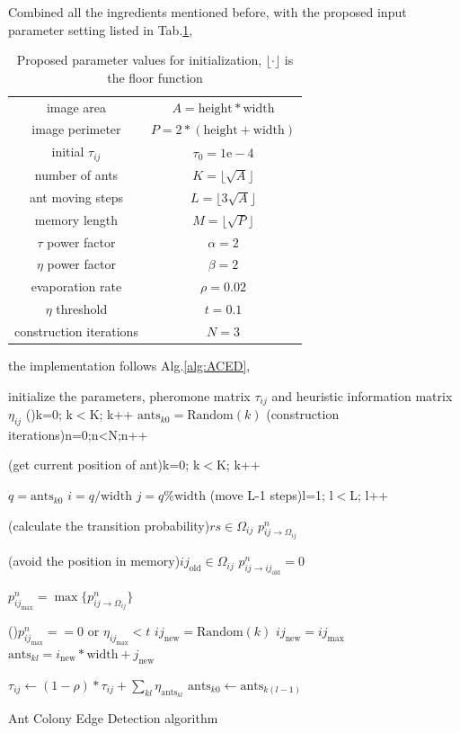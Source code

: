 \documentclass[letterpaper]{article}
\begin{document}
Combined all the ingredients mentioned before, with the proposed input parameter setting listed in Tab.\ref{tab:parameters}, 
\begin{table}[h!]
	\centering
	\begin{tabular}{|c|c|} 
		\hline
		image area & $A=\mathrm{height}*\mathrm{width}$ \\
		image perimeter & $P=2*(\mathrm{height}+\mathrm{width})$ \\
		initial $\tau_{ij}$ & $\tau_0 = 1\mathrm{e}-4$ \\
		number of ants & $K=\lfloor\sqrt{A}\rfloor$ \\
		ant moving steps & $L=\lfloor3\sqrt{A}\rfloor$ \\
		memory length & $M = \lfloor\sqrt{P}\rfloor$ \\
		$\tau$ power factor & $\alpha=2$ \\
		$\eta$ power factor & $\beta=2$ \\
		evaporation rate & $\rho=0.02$ \\
		$\eta$ threshold & $t = 0.1$ \\
		construction iterations & $N = 3$\\ 
		\hline
	\end{tabular}
	\caption{Proposed parameter values for initialization, $\lfloor\cdot\rfloor$ is the floor function}
	\label{tab:parameters}
\end{table}
the implementation follows Alg.\ref{alg:ACED},
\begin{algorithm}
	initialize the parameters, pheromone matrix $\tau_{ij}$ and heuristic information matrix $\eta_{ij}$\;
	\For(){k=0; k$<$K; k++}{
		$\mathrm{ants}_{k0}=\mathrm{Random}(k)$\;
	}
	\For(construction iterations){n=0;n<N;n++}{
		\For(get current position of ant){k=0; k$<$K; k++}{
			$q = \mathrm{ants}_{k0}$\;
			$i = q/\mathrm{width}$\;
			$j = q\%\mathrm{width}$\;
			\For(move L-1 steps){l=1; l$<$L; l++}{
				\For(calculate the transition probability){$rs\in\Omega_{ij}$}{
					$p^n_{ij\rightarrow \Omega_{ij}}$\; 
				}

				\If(avoid the position in memory){$ij_{\mathrm{old}}\in\Omega_{ij}$}{
					$p^n_{ij\rightarrow ij_{\mathrm{old}}}=0$\;
				}

				$p^n_{ij_{\max}}=\max\{p^n_{ij\rightarrow \Omega_{ij}}\}$\;

				\eIf(){$p^n_{ij_{\max}}==0$ $\mathrm{or}$ $\eta_{ij_{\max}}<t$}{
					$ij_{\mathrm{new}}=\mathrm{Random}(k)$\;
				}{
					$ij_{\mathrm{new}}=ij_{\max}$\;
				}
				$\mathrm{ants}_{kl}=i_{\mathrm{new}}*\mathrm{width}+j_{\mathrm{new}}$\;
			}
		}
		$\tau_{ij}\leftarrow(1-\rho)*\tau_{ij}+\sum_{kl}\eta_{\mathrm{ants}_{kl}}$\;
		$\mathrm{ants}_{k0}\leftarrow\mathrm{ants}_{k(l-1)}$\;
	}
	
	\caption{Ant Colony Edge Detection algorithm}\label{alg:ACED}
\end{algorithm}
\end{document}
